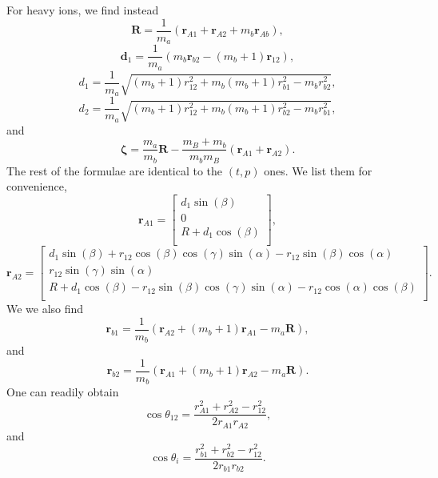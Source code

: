 For heavy ions, we find instead
\begin{equation}\label{eq198}
    \mathbf{R} =\frac{1}{m_a}\left(\mathbf{r}_{A1}+\mathbf{r}_{A2}+m_b\mathbf{r}_{Ab}\right),
\end{equation}
\begin{equation}\label{eq193}
    \mathbf{d}_1=\frac{1}{m_a}\left(m_b\mathbf{r}_{b2}-(m_b+1)\mathbf{r}_{12}\right),
\end{equation}
\begin{equation}\label{eq194}
    d_1=\frac{1}{m_a}\sqrt{(m_b+1)r_{12}^2+m_b(m_b+1)r_{b1}^2-m_br_{b2}^2},
\end{equation}
\begin{equation}\label{eq195}
    d_2=\frac{1}{m_a}\sqrt{(m_b+1)r_{12}^2+m_b(m_b+1)r_{b2}^2-m_br_{b1}^2},
\end{equation}
and
\begin{equation}\label{eq199}
    \boldsymbol{\zeta}=\frac{m_a}{m_b}\mathbf{R}-\frac{m_B+m_b}{m_bm_B}(\mathbf{r}_{A1}+\mathbf{r}_{A2}).
\end{equation}
The rest of the formulae are identical to the $(t,p)$ ones. We list them for convenience,
\begin{equation}\label{eq196}
\mathbf{r}_{A1}=
\begin{bmatrix}
  d_1\sin(\beta)\\
 0\\
 R+d_1\cos(\beta)\\
\end{bmatrix},
\end{equation}
\begin{equation}\label{eq197}
\mathbf{r}_{A2}=
\begin{bmatrix}
  d_1\sin(\beta)+r_{12}\cos(\beta)\cos(\gamma)\sin(\alpha)-r_{12}\sin(\beta)\cos(\alpha)\\
 r_{12}\sin(\gamma)\sin(\alpha)\\
 R+d_1\cos(\beta)-r_{12}\sin(\beta)\cos(\gamma)\sin(\alpha)-r_{12}\cos(\alpha)\cos(\beta)\\
\end{bmatrix}.
\end{equation}
We we also find
\begin{equation}\label{eq200}
    \mathbf{r}_{b1}=\frac{1}{m_b}(\mathbf{r}_{A2}+(m_b+1)\mathbf{r}_{A1}-m_a\mathbf{R}),
\end{equation}
and
\begin{equation}\label{eq201}
    \mathbf{r}_{b2}=\frac{1}{m_b}(\mathbf{r}_{A1}+(m_b+1)\mathbf{r}_{A2}-m_a\mathbf{R}).
\end{equation}
One can readily obtain
\begin{equation}\label{eq202}
    \cos\theta_{12}=\frac{r_{A1}^2+r_{A2}^2-r_{12}^2}{2r_{A1}r_{A2}},
\end{equation}
and
\begin{equation}\label{eq203}
    \cos\theta_{i}=\frac{r_{b1}^2+r_{b2}^2-r_{12}^2}{2r_{b1}r_{b2}}.
\end{equation}



